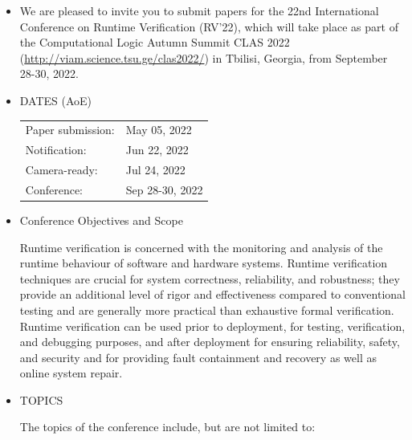\documentclass[prodmode,acmtecs]{acmsmall} %
\begin{document}
\begin{itemize}\item  We are pleased to invite you to submit papers for the 22nd International Conference on Runtime Verification (RV'22), which will take place as part of the Computational Logic Autumn Summit CLAS 2022 (\href{http://viam.science.tsu.ge/clas2022/}{http://viam.science.tsu.ge/clas2022/}) in Tbilisi, Georgia, from September 28-30, 2022. 
 
\item  DATES (AoE) 
 
\begin{tabulary}{\linewidth}{LL}Paper submission:  & May 05, 2022 \\
Notification:  & Jun 22, 2022 \\
Camera-ready:  & Jul 24, 2022 \\
Conference:  & Sep 28-30, 2022 \\
\end{tabulary}
 
\item  Conference Objectives and Scope  
 
  Runtime verification is concerned with the monitoring and analysis of the runtime behaviour of software and hardware systems. Runtime verification techniques are crucial for system correctness, reliability, and robustness; they provide an additional level of rigor and effectiveness compared to conventional testing and are generally more practical than exhaustive formal verification. Runtime verification can be used prior to deployment, for testing, verification, and debugging purposes, and after deployment for ensuring reliability, safety, and security and for providing fault containment and recovery as well as online system repair. 
 
\item  TOPICS 
 
  The topics of the conference include, but are not limited to: 
 

\end{itemize}
\end{document}
